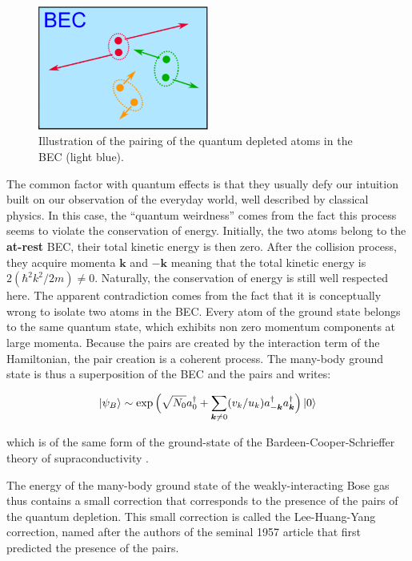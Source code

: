\begin{figure}
    \centering
    \includegraphics[width=0.5\textwidth]{Fig/Chapter1/pairs.png}
    \caption[Illustration of the \kmk pairing of the quantum depleted atoms in the BEC]{Illustration of the \kmk pairing of the quantum depleted atoms in the BEC (light blue).}
    \label{fig:bec_pairs}
\end{figure}

The common factor with quantum effects is that they usually defy our intuition built on our observation of the everyday world, well described by classical physics. In this case, the ``quantum weirdness'' comes from the fact this process seems to violate the conservation of energy. Initially, the two atoms belong to the \textbf{at-rest} BEC, their total kinetic energy is then zero. After the collision process, they acquire momenta $\bm{k}$ and $-\bm{k}$ meaning that the total kinetic energy is $2 (\hbar^2 k^2/2m) \neq 0$. Naturally, the conservation of energy is still well respected here. The apparent contradiction comes from the fact that it is conceptually wrong to isolate two atoms in the BEC. Every atom of the ground state belongs to the same quantum state, which exhibits non zero momentum components at large momenta. Because the pairs are created by the interaction term of the Hamiltonian, the pair creation is a coherent process. The many-body ground state is thus a superposition of the BEC and the pairs and writes:

\begin{equation}
     \ket{\psi_B} \sim \exp \Big(\sqrt{N_0} a^{\dagger}_0 + \sum_{\bm{k} \neq 0} (v_k/u_k) a^{\dagger}_{-\bm{k}} a^{\dagger}_{\bm{k}} \Big) \ket{0}
     \label{eq:ground_state}
\end{equation}

\noindent which is of the same form of the ground-state of the Bardeen-Cooper-Schrieffer theory of supraconductivity \cite{bardeen1957theory}. 

The energy of the many-body ground state of the weakly-interacting Bose gas thus contains a small correction that corresponds to the presence of the \kmk pairs of the quantum depletion. This small correction is called the Lee-Huang-Yang correction, named after the authors of the seminal 1957 article \cite{lee1957} that first predicted the presence of the \kmk pairs. 

